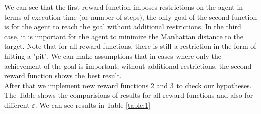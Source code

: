 \documentclass[a4paper, twoside, english]{article}
\begin{document}

We can see that the first reward function imposes restrictions on the agent in terms of execution time (or number of steps), the only goal of the second function is for the agent to reach the goal without additional restrictions. In the third case, it is important for the agent to minimize the Manhattan distance to the target. Note that for all reward functions, there is still a restriction in the form of hitting a "pit". We can make assumptions that in cases where only the achievement of the goal is important, without additional restrictions, the second reward function shows the best result.\\

After that we implement new reward functions 2 and 3 to check our hypotheses. The Table shows the comparisions of results for all reward functions and also for different $\varepsilon$.
We can see results in Table \ref{table:1}\\
\end{document}

